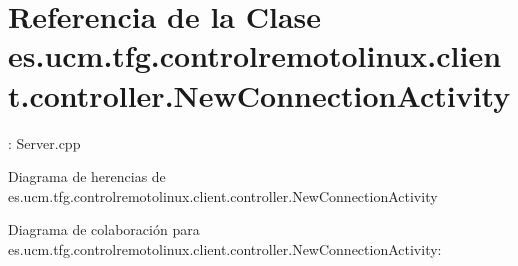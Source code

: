 \hypertarget{classes_1_1ucm_1_1tfg_1_1controlremotolinux_1_1client_1_1controller_1_1NewConnectionActivity}{\section{Referencia de la Clase es.\-ucm.\-tfg.\-controlremotolinux.\-client.\-controller.\-New\-Connection\-Activity}
\label{classes_1_1ucm_1_1tfg_1_1controlremotolinux_1_1client_1_1controller_1_1NewConnectionActivity}
}


\-: Server.\-cpp  




Diagrama de herencias de es.\-ucm.\-tfg.\-controlremotolinux.\-client.\-controller.\-New\-Connection\-Activity


Diagrama de colaboración para es.\-ucm.\-tfg.\-controlremotolinux.\-client.\-controller.\-New\-Connection\-Activity\-:
